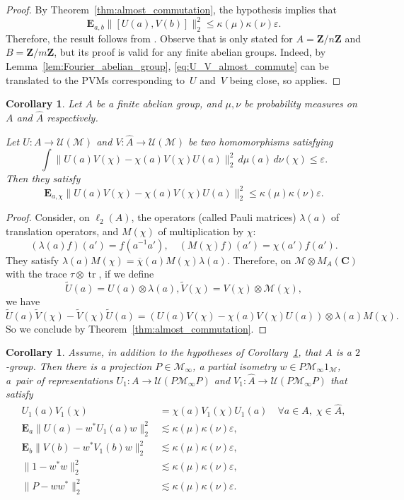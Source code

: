 \documentclass[JEP,XML,SOM,Unicode,published]{cedram}
\theoremstyle{plain}
\newtheorem{corollary}[theorem]{Corollary}
\theoremstyle{definition}
\newcommand{\C}{\mathbf{C}}
\newcommand{\Z}{\mathbf{Z}}
\newcommand{\cM}{\mathcal{M}}
\newcommand{\E}{\mathbf{E}}
\newcommand{\cU}{\mathcal{U}}
\DeclareMathOperator{\tr}{tr}
\begin{document}
\begin{proof} By Theorem~\ref{thm:almost_commutation}, the hypothesis implies that
\begin{equation}\label{eq:U_V_almost_commute} \E_{a,b} \| [U(a),V(b)]\|_2^2 \leq \kappa(\mu) \kappa(\nu) \varepsilon.
\end{equation}
Therefore, the result follows from \cite[Cor.\,5]{orthonormalisation}. Observe that \cite[Cor.\,5]{orthonormalisation} is only stated for $A=\Z/n\Z$ and $B=\Z/m\Z$, but its proof is valid for any finite abelian groups. Indeed, by Lemma~\ref{lem:Fourier_abelian_group}, \eqref{eq:U_V_almost_commute} can be translated to the PVMs corresponding to~$U$ and~$V$ being close, so \cite[Th.\,4]{orthonormalisation} applies.
\end{proof}
\begin{corollary}\label{thm:almost_anticommutation}
Let $A$ be a finite abelian group, and $\mu,\nu$ be probability measures on $A$ and $\hat A$ respectively.

Let $U:A \to \cU(\cM)$ and $V:\hat A \to \cU(\cM)$ be two homomorphisms satisfying
\[
\int \| U(a)V(\chi) -\chi(a) V(\chi) U(a) \|_2^2 \,d\mu(a) \,d\nu(\chi) \leq \varepsilon.
\]
Then they satisfy
\[
\E_{a,\chi} \| U(a)V(\chi) -\chi(a) V(\chi) U(a) \|_2^2 \leq \kappa(\mu)\kappa(\nu)\varepsilon.
\]
\end{corollary}
\begin{proof}
Consider, on $\ell_2(A)$, the operators (called Pauli matrices) $\lambda(a)$ of translation operators, and $M(\chi)$ of multiplication by $\chi$:
\[
(\lambda(a) f)(a') = f(a^{-1}a'),\quad (M(\chi) f)(a') = \chi(a') f(a').
\]
They satisfy $\lambda(a) M(\chi) = \overline{\chi}(a) M(\chi) \lambda(a)$.
Therefore, on $\cM \otimes M_A(\C)$ with the trace $\tau \otimes \tr$, if we define
\[
\tilde{U}(a) = U(a) \otimes \lambda(a), \tilde{V}(\chi) = V(\chi) \otimes \cM(\chi),
\]
we have
\[
\tilde U(a)\tilde V(\chi) -\tilde V(\chi) \tilde U(a) = (U(a)V(\chi) -\chi(a) V(\chi) U(a))\otimes \lambda(a) M(\chi).
\]
So we conclude by Theorem~\ref{thm:almost_commutation}.
\end{proof}

\begin{corollary}\label{thm:almost_anticommutation_2group}
Assume, in addition to the hypotheses of Corollary~\ref{thm:almost_anticommutation}, that $A$ is a $2$-group. Then there is a projection $P \in \cM_\infty$, a partial isometry $w \in P \cM_\infty 1_\cM$, a~pair of representations $U_1:A \to \cU(P\cM_\infty P)$ and $V_1:\hat A \to \cU(P\cM_\infty P)$ that satisfy
\begin{align*}
U_1(a) V_1(\chi) &= \chi(a) V_1(\chi) U_1(a)\quad\forall a \in A,\;\chi \in \hat A,
\\
\E_a \| U(a) - w^* U_1(a)w\|_2^2 &\lesssim \kappa(\mu)\kappa(\nu) \varepsilon,
\\
\E_b \| V(b) - w^* V_1(b)w\|_2^2 &\lesssim \kappa(\mu)\kappa(\nu) \varepsilon,
\\
\|1-w^*w\|_2^2 &\lesssim \kappa(\mu)\kappa(\nu) \varepsilon,
\\
\|P-ww^*\|_2^2 &\lesssim \kappa(\mu)\kappa(\nu) \varepsilon.
\end{align*}
\end{corollary}
\end{document}
